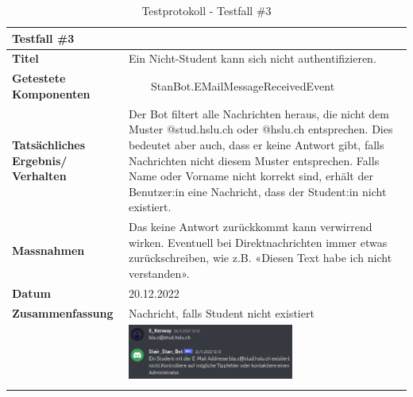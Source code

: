 \documentclass[a4paper, table]{article}
\newcommand{\tabitem}{~~\llap{\textbullet}~~}
\begin{document}
\begin{longtable}[h]{|p{9em}|p{31em}|}
    \hline
    \multicolumn{2}{|l|}{\textbf{Testfall \#3}} \\
    \hline
    \textbf{Titel} & Ein Nicht-Student kann sich nicht authentifizieren. \\
    \hline
    \textbf{Getestete Komponenten} &  \tabitem StanBot.EMailMessageReceivedEvent \\
    \hline
    \textbf{Tatsächliches Ergebnis/ Verhalten} & 
        Der Bot filtert alle Nachrichten heraus, die nicht dem Muster @stud.hslu.ch oder @hslu.ch entsprechen.
        Dies bedeutet aber auch, dass er keine Antwort gibt, falls Nachrichten nicht diesem Muster entsprechen.
        Falls Name oder Vorname nicht korrekt sind, erhält der Benutzer:in eine Nachricht, dass der Student:in nicht existiert. \\
    \hline
    \textbf{Massnahmen} & 
        Das keine Antwort zurückkommt kann verwirrend wirken. 
        Eventuell bei Direktnachrichten immer etwas zurückschreiben, wie \gls{z.B.} «Diesen Text habe ich nicht verstanden». \\
    \hline
    \textbf{Datum} & 20.12.2022\\
    \hline
    \textbf{Zusammenfassung} & 
        Nachricht, falls Student nicht existiert \\*
     &  \includegraphics[width=0.6\textwidth]{img/Tests/3_Test_StudentNotFound.png} \\
    \hline
    \caption{Testprotokoll - Testfall \#3}
\end{longtable}
\end{document}
